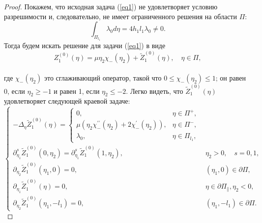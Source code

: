 \documentclass[12pt,titlepage]{report}
\begin{document}
\begin{proof}
	Покажем, что исходная задача (\ref{eq1}) не удовлетворяет условию разрешимости и, следовательно, не имеет ограниченного решения на области $\Pi$:\\
	  $$\int_{\Pi_{l_{1}}} \lambda_{0} d \eta = 4 h_{1} l_{1} \lambda_{0} \neq 0.$$
	Тогда будем искать решение для задачи (\ref{eq1}) в виде \\
	$$Z_{1}^{(0)}(\eta)=\mu \eta_{2} \chi_{-}\left(\eta_{2}\right)+\widetilde{Z}_{1}^{(0)}(\eta), \quad \eta \in \Pi,$$\\
	где $\chi_{-}\left(\eta_{2}\right)$ это сглаживающий оператор, такой что $0 \leq \chi_{-}\left(\eta_{2}\right) \leq 1$; он равен 0, если $\eta_{2} \geq-1$ и равен 1, если $\eta_{2} \leq-2$. Легко видеть, что $\widetilde{Z}_{1}^{(0)}(\eta)$ удовлетворяет следующей краевой задаче:
	\begin{equation}
	\label{eq11}
	\left\{\begin{array}{ll}
	-\Delta_{\eta} \widetilde{Z}_{1}^{(0)}(\eta)=\left\{\begin{array}{ll}
	0, & \eta \in \Pi^{+}, \\
	\mu\left(\eta_{2} \chi_{-}^{\prime \prime}\left(\eta_{2}\right)+2 \chi_{-}^{\prime}\left(\eta_{2}\right)\right), & \eta \in \Pi^{-},\\
	\lambda_{0}, & \eta \in \Pi_{l_{1}},
	\end{array}\right. \\
	\partial_{\eta_{1}}^{s} \tilde{Z}_{1}^{(0)}\left(0, \eta_{2}\right)=\partial_{\eta_{1}}^{s} \tilde{Z}_{1}^{(0)}\left(1, \eta_{2}\right), & \eta_{2}>0, \quad s=0,1,\\
	\partial_{\eta_{2}} \widetilde{Z}_{1}^{(0)}\left(\eta_{1}, 0\right)=0, & \left(\eta_{1}, 0\right) \in \partial \Pi,\\
	\partial_{\eta_{1}} \widetilde{Z}_{1}^{(0)}(\eta)=0, & \eta \in \partial \Pi_{\|}, \eta_{2}<0, \\
	\partial_{\eta_{2}} \widetilde{Z}_{1}^{(0)}\left(\eta_{1},-l_{1}\right) = 0, & \left(\eta_{1},-l_{1}\right) \in \partial \Pi.
	\end{array}\right.
	\end{equation}
	

\end{proof}
\end{document}
